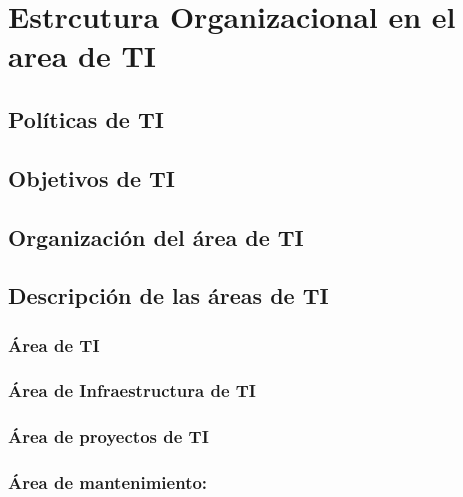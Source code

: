 \section{Estrcutura Organizacional en el area de TI}


\subsection{Políticas de TI}
\lipsum[1]

\subsection{Objetivos de TI}
\lipsum[1]
\subsection{Organización del área de TI}
\lipsum[1]
\subsection{Descripción de las áreas de TI}
\lipsum[1]


\subsubsection{Área de TI}
\subsubsection{Área de Infraestructura de TI}
\lipsum[1]
\subsubsection{Área de proyectos de TI}
\lipsum[1]
\subsubsection{Área de mantenimiento: }

